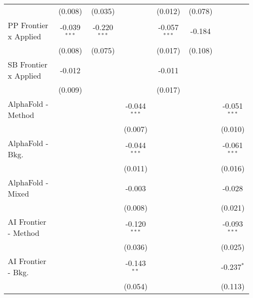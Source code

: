 \begin{tabular}{lcccccc}
                                  & (0.008)        & (0.035)        &                & (0.012)        & (0.078)        &   \\   
   PP Frontier x Applied          & -0.039$^{***}$ & -0.220$^{***}$ &                & -0.057$^{***}$ & -0.184         &   \\   
                                  & (0.008)        & (0.075)        &                & (0.017)        & (0.108)        &   \\   
   SB Frontier x Applied          & -0.012         &                &                & -0.011         &                &   \\   
                                  & (0.009)        &                &                & (0.017)        &                &   \\   
   AlphaFold - Method             &                &                & -0.044$^{***}$ &                &                & -0.051$^{***}$\\   
                                  &                &                & (0.007)        &                &                & (0.010)\\   
   AlphaFold - Bkg.               &                &                & -0.044$^{***}$ &                &                & -0.061$^{***}$\\   
                                  &                &                & (0.011)        &                &                & (0.016)\\   
   AlphaFold - Mixed              &                &                & -0.003         &                &                & -0.028\\   
                                  &                &                & (0.008)        &                &                & (0.021)\\   
   AI Frontier - Method           &                &                & -0.120$^{***}$ &                &                & -0.093$^{***}$\\   
                                  &                &                & (0.036)        &                &                & (0.025)\\   
   AI Frontier - Bkg.             &                &                & -0.143$^{**}$  &                &                & -0.237$^{*}$\\   
                                  &                &                & (0.054)        &                &                & (0.113)\\   

\end{tabular}
